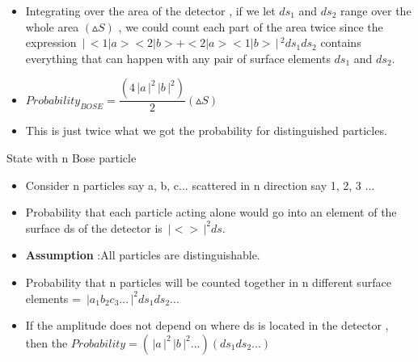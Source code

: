 \documentclass[aspectratio=169]{beamer}
\begin{document}
\begin{frame}
	\begin{itemize}
		\item Integrating over the area of the detector ,  if we let $ds_{1}$ and $ds_{2}$ range over the whole area $(\vartriangle S)$ , we could count each part of the area twice since the expression $\,\Bigr\rvert\,<1|a><2|b> + <2|a><1|b>\,\Bigr\rvert\,^{2} ds_{1} ds_{2}$ contains everything that can happen with any pair of surface elements $ds_{1}$ and $ds_{2}$. \newline
		\item $ Probability_{BOSE} = \dfrac{ \left(4\,\Bigr\rvert a \,\Bigr\rvert^{2} \,\Bigr\rvert b \,\Bigr\rvert^{2}\right)}{2} \left(\vartriangle S\right)$ \newline
		\item This is just twice what we got the probability for distinguished particles. 

	\end{itemize}
\end{frame}

\begin{frame}{State with n Bose particle}
	\begin{itemize}
		\item Consider n particles say a, b, c... scattered in n direction say 1, 2, 3 ... \newline
		\item Probability that each particle acting alone would go into an element of the surface ds of the detector is $\,\Bigr\rvert < >\,\Bigr\rvert^{2} ds$. 
	\end{itemize}
\end{frame} 

\begin{frame}
	\begin{itemize}
		\item \textbf{Assumption} :All particles are distinguishable. \newline
		\item Probability that n particles will be counted together in n different surface elements = $\,\Bigr\rvert a_{1}b_{2}c_{3}... \,\Bigr\rvert^{2}ds_{1}ds_{2}...$ \newline
		\item If the amplitude does not depend on where ds is located in the detector , then the \newline
		$Probability = \left(\,\Bigr\rvert a \,\Bigr\rvert^{2}\,\Bigr\rvert b \,\Bigr\rvert^{2}...\right)(ds_{1}ds_{2}...)$
	\end{itemize}
\end{frame} 
\end{document}
